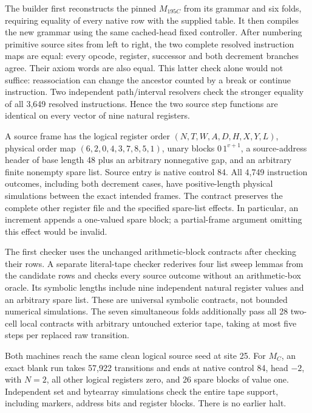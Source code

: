 The builder first reconstructs the pinned $M_{195C}$ from its grammar and
six folds, requiring equality of every native row with the supplied table.
It then compiles the new grammar using the same cached-head fixed
controller. After numbering primitive source sites from left to right,
the two complete resolved instruction maps are equal: every opcode,
register, successor and both decrement branches agree. Their axiom words
are also equal. This latter check alone would not suffice: reassociation
can change the ancestor counted by a break or continue instruction.
Two independent path/interval resolvers check the stronger equality of
all 3,649 resolved instructions. Hence the two source step functions are
identical on every vector of nine natural registers.

A source frame has the logical register order
$(N,T,W,A,D,H,X,Y,L)$, physical order map
$(6,2,0,4,3,7,8,5,1)$, unary blocks $0\,1^{v+1}$, a source-address
header of base length 48 plus an arbitrary nonnegative gap, and an
arbitrary finite nonempty spare list. Source entry is native control 84.
All 4,749 instruction outcomes, including both decrement cases, have
positive-length physical simulations between the exact intended frames.
The contract preserves the complete other register file and the specified
spare-list effects. In particular, an increment appends a one-valued spare
block; a partial-frame argument omitting this effect would be invalid.

The first checker uses the unchanged arithmetic-block contracts after
checking their rows. A separate literal-tape checker rederives four list
sweep lemmas from the candidate rows and checks every source outcome
without an arithmetic-box oracle. Its symbolic lengths include nine
independent natural register values and an arbitrary spare list. These
are universal symbolic contracts, not bounded numerical simulations.
The seven simultaneous folds additionally pass all 28 two-cell local
contracts with arbitrary untouched exterior tape, taking at most five
steps per replaced raw transition.

Both machines reach the same clean logical source seed at site 25.
For $M_C$, an exact blank run takes 57,922 transitions and ends at native
control 84, head $-2$, with $N=2$, all other logical registers zero, and
26 spare blocks of value one. Independent set and bytearray simulations
check the entire tape support, including markers, address bits and
register blocks. There is no earlier halt.

